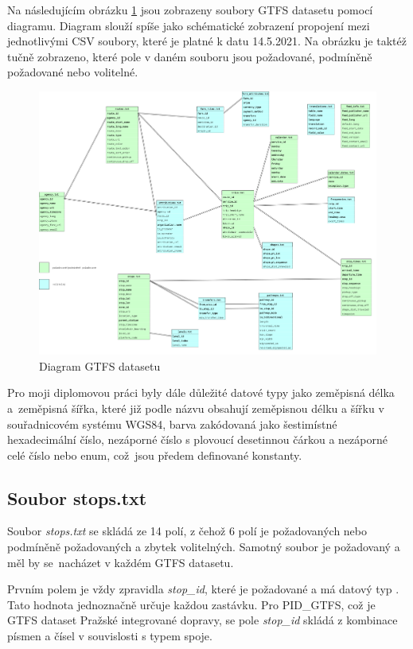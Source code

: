 Na následujícím obrázku \ref{fig:GTFS-diagram} jsou zobrazeny soubory GTFS datasetu pomocí diagramu.
Diagram slouží spíše jako schématické zobrazení propojení mezi jednotlivými CSV soubory, které je platné k datu
14.5.2021.
Na obrázku je taktéž tučně zobrazeno, které pole v daném  souboru
jsou požadované, podmíněně požadované nebo volitelné. 

\begin{figure}[H] \centering
    \includegraphics[width=400pt]{./pictures/GTFS-diagram.PNG}
    \caption[Diagram GTFS datasetu]{Diagram GTFS datasetu}
	\label{fig:GTFS-diagram}              
\end{figure}

Pro moji diplomovou práci byly dále důležité datové typy jako zeměpisná délka a~zeměpisná šířka,
které již podle názvu obsahují zeměpisnou délku a šířku v souřadnicovém systému WGS84, barva zakódovaná 
jako šestimístné hexadecimální číslo, nezáporné číslo s plovoucí desetinnou čárkou a nezáporné celé číslo
nebo enum, což~jsou předem definované konstanty.

\subsection{Soubor stops.txt}
\label{stops.txt}
Soubor \textit{stops.txt} se skládá ze 14 polí, z čehož 6 polí je požadovaných nebo podmíněně požadovaných 
a zbytek volitelných. Samotný soubor je požadovaný a měl by se~nacházet v každém GTFS datasetu.

Prvním polem je vždy zpravidla \textit{stop\_id}, které je požadované a má datový typ .
Tato hodnota jednoznačně určuje každou zastávku. Pro PID\_GTFS, což je GTFS dataset Pražské integrované dopravy,
se pole \textit{stop\_id} skládá z kombinace písmen a čísel v souvislosti s typem spoje.

